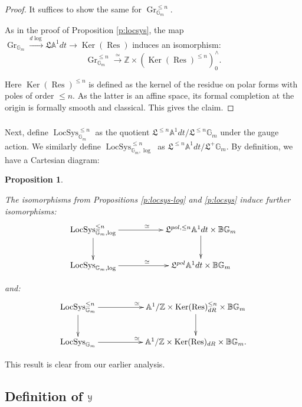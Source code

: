 \documentclass[reqno,11pt]{amsart}
\numberwithin{equation}{subsection}
\newtheorem{prop}[thm]{Proposition}
\theoremstyle{remark}
\newcommand{\xar}[1]{\xrightarrow{#1}}
\newcommand{\rar}[1]{\xar{#1}}
\newcommand{\isom}{\rar{\simeq}}
\newcommand{\bA}{{\mathbb A}}
\newcommand{\bB}{{\mathbb B}}
\newcommand{\bG}{{\mathbb G}}
\newcommand{\bZ}{{\mathbb Z}}
\newcommand{\sY}{{\EuScript Y}}
\newcommand{\fL}{{\mathfrak L}}
\newcommand{\on}{\operatorname}
\newcommand{\Ker}{\on{Ker}}
\newcommand{\Res}{\on{Res}}
\newcommand{\Gr}{\on{Gr}}
\newcommand{\LocSys}{\on{LocSys}}
\begin{document}
\begin{proof}

It suffices to show the same for $\Gr_{\bG_m}^{\leq n}$.

As in the proof of Proposition \ref{p:locsys}, the map
$\Gr_{\bG_m} \xar{d\log} \fL \bA^1 dt \to \Ker(\Res)$ induces an
isomorphism:
%
\[
\Gr_{\bG_m}^{\leq n} \isom \bZ \times (\Ker(\Res)^{\leq n})_0^{\wedge}.
\]

\noindent Here $\Ker(\Res)^{\leq n}$
is defined as the kernel of the
residue on polar forms with poles of order $\leq n$. 
As the latter is an affine space, its formal completion at the origin
is formally smooth and classical. This gives the claim.

\end{proof}

\subsubsection{}

Next, define $\LocSys_{\bG_m}^{\leq n}$ as the quotient
$\fL^{\leq n} \bA^1 dt/\fL^{\leq n} \bG_m$ under the gauge action.
We similarly define $\LocSys_{\bG_m,\log}^{\leq n}$ as 
$\fL^{\leq n} \bA^1 dt/\fL^+ \bG_m$. By definition, 
we have a Cartesian diagram:

\begin{prop}\label{p:locsys-trun}

The isomorphisms from Propositions \ref{p:locsys-log} and \ref{p:locsys}
induce further isomorphisms:
%
\[
\xymatrix{
\LocSys_{\bG_m,\log}^{\leq n} \ar[rr]^{\simeq}
\ar[d] & & \fL^{pol,\leq n} \bA^1 dt \times \bB \bG_m \ar[d] \\
\LocSys_{\bG_m,\log} \ar[rr]^{\simeq}
 & & \fL^{pol} \bA^1 dt \times \bB \bG_m
}
\]

\noindent and:
%
\[
\xymatrix{
\LocSys_{\bG_m}^{\leq n} \ar[rr]^{\simeq} \ar[d] 
& &
\bA^1/\bZ \times \Ker(\Res)_{dR}^{\leq n} \times \bB \bG_m \ar[d] \\
\LocSys_{\bG_m} \ar[rr]^{\simeq}
& &
\bA^1/\bZ \times \Ker(\Res)_{dR} \times \bB \bG_m.
}
\]

\end{prop}

This result is clear from our earlier analysis.


\subsection{Definition of $\sY$}\label{ss:y-defin}
\end{document}
